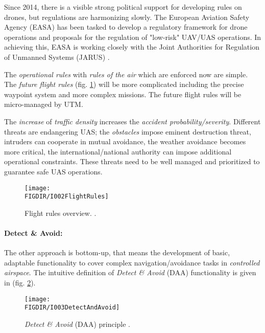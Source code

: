 \documentclass[a4paper,narrowmargins,11pt,oneside,onehalfspaced,singlespacednotes]{fcup-thesis}
\newcommand{\FIGDIR}{./Pics}    %
\theoremstyle{plain}
\theoremstyle{plain}
\theoremstyle{remark}
\begin{document}
Since 2014, there is a visible strong political support for developing rules on drones, but regulations are harmonizing slowly. The European Aviation Safety Agency (EASA) has been tasked to develop a regulatory framework for drone operations and proposals for the regulation of "low-risk" UAV/UAS operations. In achieving this, EASA is working closely with the Joint Authorities for Regulation of Unmanned Systems (JARUS) \cite{jarus2016regulations}.

The \emph{operational rules} with \emph{rules of the air} \cite{icaoAnnex2} which are enforced now are simple. The \emph{future flight rules} (fig. \ref{fig:flightRulesIntro}) will be more complicated including the precise waypoint system and more complex missions. The future flight rules will be micro-managed by UTM.

The \emph{increase} of \emph{traffic density} increases the \emph{accident probability/severity}.  Different threats are endangering UAS; the \emph{obstacles} impose eminent destruction threat, intruders can cooperate in mutual avoidance, the weather avoidance becomes more critical, the international/national authority can impose additional operational constraints. These threats need to be well managed and prioritized to guarantee safe UAS operations.

\begin{figure}[H]
    \centering
    \texttt{[image: \\FIGDIR/I002FlightRules]}
    \caption{Flight rules overview. \cite{airbusUTM2018blueprint}.}
    \label{fig:flightRulesIntro}
\end{figure}

\paragraph{Detect \& Avoid:} The other approach is bottom-up, that means the development of basic, adaptable functionality to cover complex navigation/avoidance tasks in \emph{controlled airspace}. The intuitive definition of \emph{Detect \& Avoid} (DAA) functionality is given in (fig. \ref{fig:detectAdnAvoidIntroduction}).



\begin{figure}[H]
    \centering
    \texttt{[image: \\FIGDIR/I003DetectAndAvoid]}
    \caption{\emph{Detect \& Avoid} (DAA) principle \cite{jenie2014velocity}.}
    \label{fig:detectAdnAvoidIntroduction}
\end{figure}
\end{document}
